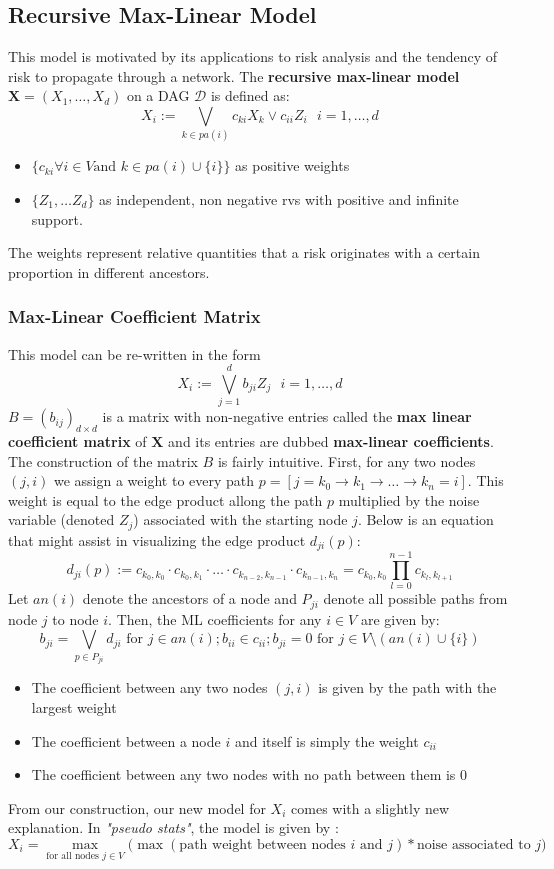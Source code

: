 \documentclass[12pt]{article}
\def\x{\mathbf{X}}
\newcommand{\ds}{\displaystyle}
\theoremstyle{definition}
\begin{document}
\subsection{Recursive Max-Linear Model}
 This model is motivated by its applications to risk analysis and the tendency of risk to propagate through a network. The \textbf{recursive max-linear model} $\x=(X_1,\hdots, X_d)$ on a DAG $\mathcal{D}$ is defined as:
$$X_i:= \bigvee_{k\in pa(i)}c_{ki}X_k \vee c_{ii}Z_i\ \ \  i=1,\hdots,d$$
\begin{itemize}
    \item $\ds \{c_{ki} \forall i \in V \text{and } k \in pa(i)\cup\{i\}\}$ as positive weights 
    \item $\{Z_1, \hdots Z_d\}$ as independent, non negative rvs with positive and infinite support.
\end{itemize}
The weights represent relative quantities that a risk originates with a certain proportion in different ancestors.

\subsubsection{Max-Linear Coefficient Matrix}
\noindent This model can be re-written in the form $$X_i:= \bigvee_{j=1}^db_{ji}Z_j\ \ \  i=1,\hdots,d$$
$B=(b_{ij})_{d\times d}$ is a matrix with non-negative entries called the \textbf{max linear coefficient matrix} of $\x$ and its entries are dubbed \textbf{max-linear coefficients}. The construction of the matrix $B$ is fairly intuitive. First, for any two nodes $(j,i)$ we assign a weight to every path $p= [j=k_0\rightarrow k_1\rightarrow \hdots \rightarrow k_n=i]$. This weight is equal to the edge product allong the path $p$ multiplied by the noise variable (denoted $Z_j$) associated with the starting node $j$. Below is an equation that might assist in visualizing the edge product $d_{ji}(p)$:
$$d_{ji}(p):=c_{k_0,k_0}\cdot c_{k_0,k_1}\cdot\hdots\cdot c_{k_{n-2},k_{n-1}}\cdot c_{k_{n-1},k_n}=c_{k_0,k_0}\prod_{l=0}^{n-1}c_{k_l,k_{l+1}}$$
Let $an(i)$ denote the ancestors of a node and $P_{ji}$ denote all possible paths from node $j$ to node $i$. Then, the ML coefficients for any $i\in V$ are given by:
$$b_{ji}=\bigvee_{p\in P_{ji}}d_{ji} \text{ for }j\in an(i);b_{ii}\in c_{ii}; b_{ji}=0 \text{ for } j \in V \setminus (an(i)\cup \{i\})$$
\begin{itemize}
    \item The coefficient between any two nodes $(j,i)$ is given by the path with the largest weight
    \item The coefficient between a node $i$ and itself is simply the weight $c_{ii}$
    \item The coefficient between any two nodes with no path between them is $0$
\end{itemize}
From our construction, our new model for $X_i$ comes with a slightly new explanation. In \textit{"pseudo stats"}, the model is given by :
$$X_i=\max_{\text{for all nodes }j\in V}\bigg( \max(\text{path weight between nodes }i \text{ and }j ) * \text{noise associated to }j\bigg) $$
\end{document}
